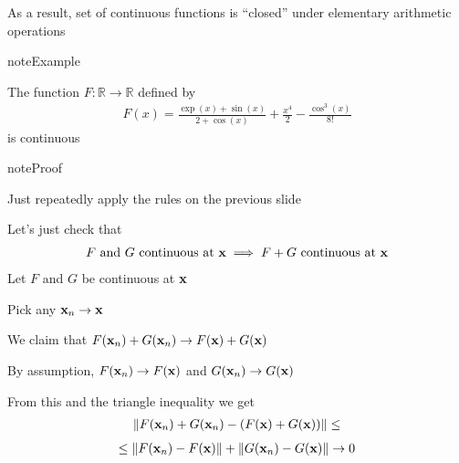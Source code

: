 \documentclass[letterpaper,10pt,english]{jupyterBook}
\begin{document}
\sphinxAtStartPar
As a result, set of continuous functions is “closed” under elementary
arithmetic operations

\begin{sphinxadmonition}{note}{Example}

\sphinxAtStartPar
The function \(F \colon \mathbb{R} \to \mathbb{R}\) defined by
\begin{equation*}
\begin{split}
F(x) = \frac{\exp(x) + \sin(x)}{2 + \cos(x)} + \frac{x^4}{2}
- \frac{\cos^3(x)}{8!}
\end{split}
\end{equation*}
\sphinxAtStartPar
is continuous
\end{sphinxadmonition}

\begin{sphinxadmonition}{note}{Proof}

\sphinxAtStartPar
Just repeatedly apply the rules on the previous slide

\sphinxAtStartPar
Let’s just check that
\begin{equation*}
\begin{split}
\text{$F$ and $G$ continuous at ${\bf x}$}
\implies 
\text{$F + G$ continuous at ${\bf x}$}
\end{split}
\end{equation*}
\sphinxAtStartPar
{} Let \(F\) and \(G\) be continuous at \({\bf x}\)

\sphinxAtStartPar
Pick any \({\bf x}_n \to {\bf x}\)

\sphinxAtStartPar
We claim that
\(F({\bf x}_n) + G({\bf x}_n) \to F({\bf x}) + G({\bf x})\)

\sphinxAtStartPar
By assumption, \(F({\bf x}_n) \to F({\bf x})\) and \(G({\bf x}_n) \to G({\bf x})\)

\sphinxAtStartPar
From this and the triangle inequality we get
\begin{equation*}
\begin{split}
\| F({\bf x}_n) + G({\bf x}_n) - (F({\bf x}) + G({\bf x})) \|
\leq 
\end{split}
\end{equation*}\begin{equation*}
\begin{split}
\leq 
\| F({\bf x}_n) - F({\bf x}) \|
+
\| G({\bf x}_n) - G({\bf x}) \|
\to 0
\end{split}
\end{equation*}\end{sphinxadmonition}
\end{document}
